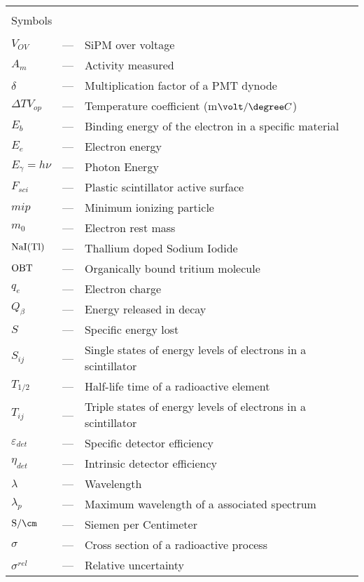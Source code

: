 \begin{longtable}{p{25mm} c p{120mm} }
\\
\\
\multicolumn{3}{l}{Symbols}\\
\\
$V_{OV}$ & --- & SiPM over voltage\\
$A_{m}$ & --- & Activity measured\\
$\delta$ & --- & Multiplication factor of a PMT dynode\\
$\Delta TV_{op}$ & --- & Temperature coefficient (m$\volt/\degree C$)\\
$E_b$ & --- & Binding energy of the electron in a specific material\\
$E_e$ & --- & Electron energy\\
$E_\gamma = h\nu$ & --- & Photon Energy\\
$F_{sci}$ & --- & Plastic scintillator active surface\\
$mip$ & --- & Minimum ionizing particle\\
$m_0$ & --- & Electron rest mass\\
$\ce{NaI(Tl)}$ & --- & Thallium doped Sodium Iodide\\
$\ce{OBT}$ & --- & Organically bound tritium molecule\\
$q_{e}$ & --- & Electron charge\\
$Q_\beta$ & --- & Energy released in decay\\
$S$ & --- & Specific energy lost\\
$S_{ij}$ & --- & Single states of energy levels of electrons in a 
\newline
scintillator\\
$T_{1/2}$ & --- & Half-life time of a radioactive element\\
$T_{ij}$ & --- & Triple states of energy levels of electrons in a 
\newline
scintillator\\
$\varepsilon_{det}$ & --- & Specific detector efficiency\\
$\eta_{det}$ & --- & Intrinsic detector efficiency\\
$\lambda$ & --- & Wavelength\\
$\lambda_p$ & --- & Maximum wavelength of a
\newline 
associated spectrum\\
$\text{S}/\cm$ & --- & Siemen per Centimeter\\
$\sigma$ & --- & Cross section of a radioactive process\\
$\sigma^{rel}$ & --- & Relative uncertainty\\

\end{longtable}
